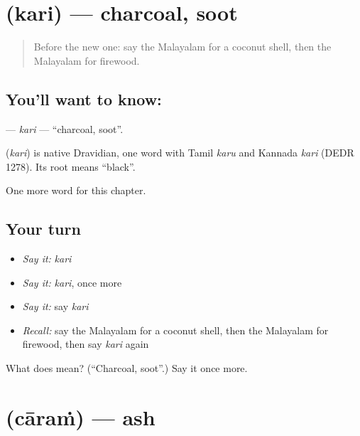 \section[\texorpdfstring{\ml{കരി} (kari)}{കരി (kari)}]{ (kari) — charcoal, soot}

\label{lesson:ML-C332-kari}



\begin{quote}
Before the new one: say the Malayalam for a coconut shell, then the Malayalam for firewood.
\end{quote}

\subsection*{You'll want to know: }
\textbf{} — \emph{kari} — \textquotedblleft{}charcoal, soot\textquotedblright{}.

\begin{cousinweb}
\textbf{} (\emph{kari}) is native Dravidian, one word with Tamil \emph{karu} and Kannada \emph{kari} (DEDR 1278). Its root means \textquotedblleft{}black\textquotedblright{}.
\end{cousinweb}

\begin{grammarlens}[title={What you've built}]
One more word for this chapter.
\end{grammarlens}

\subsection*{Your turn}
\begin{itemize}
\raggedright
  \item \emph{Say it:} \emph{kari}
  \item \emph{Say it:} \emph{kari}, once more
  \item \emph{Say it:} say \emph{kari}
  \item \emph{Recall:} say the Malayalam for a coconut shell, then the Malayalam for firewood, then say \emph{kari} again
\end{itemize}

\begin{tcolorbox}[breakable,colback=teal!4,colframe=teal!35!black,title={Before you move on}]
What does  mean? (\textquotedblleft{}Charcoal, soot\textquotedblright{}.) Say it once more.
\end{tcolorbox}
\section[\texorpdfstring{\ml{ചാരം} (cāraṁ)}{ചാരം (cāraṁ)}]{ (cāraṁ) — ash}

